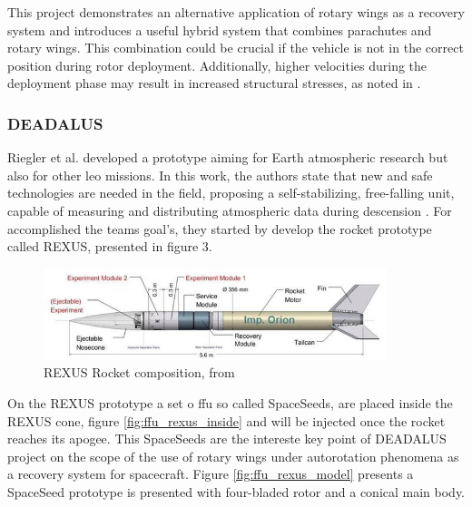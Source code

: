 This project demonstrates an alternative application of rotary wings as a recovery system and introduces a useful hybrid system that combines parachutes and rotary wings. This combination could be crucial if the vehicle is not in the correct position during rotor deployment. Additionally, higher velocities during the deployment phase may result in increased structural stresses, as noted in \cite{noauthor_armada_nodate}.

\subsubsection{DEADALUS}

Riegler et al. developed a prototype \cite{riegler_daedalus_2018} aiming for Earth atmospheric research but also for other \gls{leo} missions. In this work, the authors state that new and safe technologies are needed in the field, proposing a self-stabilizing, free-falling unit, capable of measuring and distributing atmospheric data during descension \cite{riegler_daedalus_2018}. For accomplished the teams goal's, they started by develop the rocket prototype called REXUS, presented in figure 3. 


\begin{figure}[!htb]
    \centering
    \includegraphics[width=10cm]{Figures/literature_review/REXUS-Rocket-composition_W640.jpg}
    \caption{REXUS Rocket composition, from \cite{riegler_daedalus_2018}}
    \label{fig:rexus_rocket}
\end{figure}

On the REXUS prototype a set o  \gls{ffu} so called SpaceSeeds, are placed inside the REXUS cone, figure \ref{fig:ffu_rexus_inside} and will be injected once the rocket reaches its apogee. This SpaceSeeds are the intereste key point of DEADALUS project on the scope of the use of rotary wings under autorotation phenomena as a recovery system for spacecraft. Figure \ref{fig:ffu_rexus_model} presents a SpaceSeed prototype is presented with four-bladed rotor and a conical main body.



